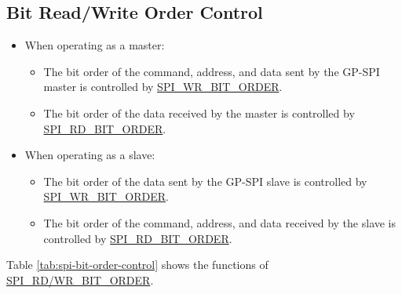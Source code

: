 \documentclass[main\_\_EN.tex]{subfiles}
\begin{document}
\subsection{Bit Read/Write Order Control}
\begin{itemize}
    \item When operating as a master:
        \begin{itemize}
            \item The bit order of the command, address, and data sent by the GP-SPI master is controlled by \hyperref[fielddesc:SPIWRBITORDER]{SPI\_WR\_BIT\_ORDER}.
            \item The bit order of the data received by the master is controlled by \hyperref[fielddesc:SPIRDBITORDER]{SPI\_RD\_BIT\_ORDER}.
        \end{itemize}
    \item When operating as a slave:
        \begin{itemize}
            \item The bit order of the data sent by the GP-SPI slave is controlled by \hyperref[fielddesc:SPIWRBITORDER]{SPI\_WR\_BIT\_ORDER}.
            \item The bit order of the command, address, and data received by the slave is controlled by \hyperref[fielddesc:SPIRDBITORDER]{SPI\_RD\_BIT\_ORDER}.
        \end{itemize}
\end{itemize}

Table \ref{tab:spi-bit-order-control} shows the functions of \hyperref[fielddesc:SPIRDBITORDER]{SPI\_RD/WR\_BIT\_ORDER}.
\end{document}

